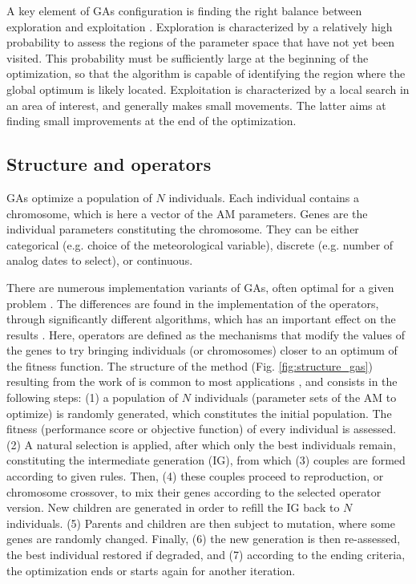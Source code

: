\documentclass{ametsoc}
\begin{document}
A key element of GAs configuration is finding the right balance between exploration and exploitation \citep{Back1992a, Smith1997a}. Exploration is characterized by a relatively high probability to assess the regions of the parameter space that have not yet been visited. This probability must be sufficiently large at the beginning of the optimization, so that the algorithm is capable of identifying the region where the global optimum is likely located. Exploitation is characterized by a local search in an area of interest, and generally makes small movements. The latter aims at finding small improvements at the end of the optimization.


\subsection{Structure and operators}
\label{sec:gas:operators}

GAs optimize a population of $N$ individuals. Each individual contains a chromosome, which is here a vector of the AM parameters. Genes are the individual parameters constituting the chromosome. They can be either categorical (e.g. choice of the meteorological variable), discrete (e.g. number of analog dates to select), or continuous.

There are numerous implementation variants of GAs, often optimal for a given problem \citep{Hart1991a, Schraudolph1992a}. The differences are found in the implementation of the operators, through significantly different algorithms, which has an important effect on the results \citep{Gaffney2010a}. Here, operators are defined as the mechanisms that modify the values of the genes to try bringing individuals (or chromosomes) closer to an optimum of the fitness function. The structure of the method (Fig. \ref{fig:structure_gas}) resulting from the work of \citet{Holland1992b} is common to most applications \citep{Back1993b}, and consists in the following steps: (1) a population of $N$ individuals (parameter sets of the AM to optimize) is randomly generated, which constitutes the initial population. The fitness (performance score or objective function) of every individual is assessed. (2) A natural selection is applied, after which only the best individuals remain, constituting the intermediate generation (IG), from which (3) couples are formed according to given rules. Then, (4) these couples proceed to reproduction, or chromosome crossover, to mix their genes according to the selected operator version. New children are generated in order to refill the IG back to $N$ individuals. (5) Parents and children are then subject to mutation, where some genes are randomly changed. Finally, (6) the new generation is then re-assessed, the best individual restored if degraded, and (7) according to the ending criteria, the optimization ends or starts again for another iteration.
\end{document}
